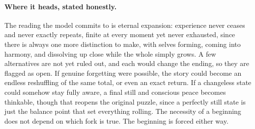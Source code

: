 \paragraph{Where it heads, stated honestly.}
The reading the model commits to is eternal expansion: experience never ceases and never
exactly repeats, finite at every moment yet never exhausted, since there is always one more
distinction to make, with selves forming, coming into harmony, and dissolving up close while
the whole simply grows. A few alternatives are not yet ruled out, and each would change the
ending, so they are flagged as open. If genuine forgetting were possible, the story could
become an endless reshuffling of the same total, or even an exact return. If a changeless state
could somehow stay fully aware, a final still and conscious peace becomes thinkable, though that
reopens the original puzzle, since a perfectly still state is just the balance point that set
everything rolling. The necessity of a beginning does not depend on which fork is true. The
beginning is forced either way.
